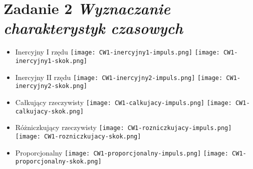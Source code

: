 \documentclass[a4paper,10pt]{article}
\begin{document}
\section{Zadanie 2 \textit{\small Wyznaczanie charakterystyk czasowych}}\label{sec:zad2}

\begin{itemize}
\item Inercyjny I rzędu
\newline \texttt{[image: CW1-inercyjny1-impuls.png]}
\newline \texttt{[image: CW1-inercyjny1-skok.png]}
\item Inercyjny II rzędu
\newline \texttt{[image: CW1-inercyjny2-impuls.png]}
\newline \texttt{[image: CW1-inercyjny2-skok.png]}
\item Całkujący rzeczywisty
\newline \texttt{[image: CW1-calkujacy-impuls.png]}
\newline \texttt{[image: CW1-calkujacy-skok.png]}
\item Różniczkujący rzeczywisty
\newline \texttt{[image: CW1-rozniczkujacy-impuls.png]}
\newline \texttt{[image: CW1-rozniczkujacy-skok.png]}
\item Proporcjonalny
\newline \texttt{[image: CW1-proporcjonalny-impuls.png]}
\newline \texttt{[image: CW1-proporcjonalny-skok.png]}
\end{itemize}
\end{document}

